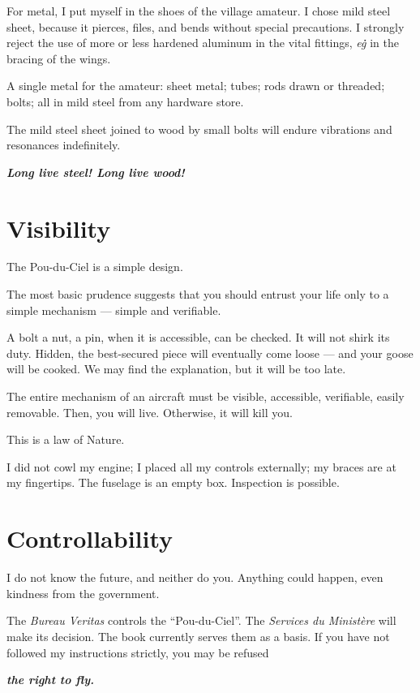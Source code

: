 \documentclass{book}
\begin{document}
For metal, I put myself in the shoes of the village amateur. I chose
mild steel sheet, because it pierces, files, and bends without special
precautions. I strongly reject the use of more or less hardened
aluminum in the vital fittings, \textit{e\.g\.} in the bracing of the
wings.

A single metal for the amateur: sheet metal; tubes; rods drawn or
threaded; bolts; all in mild steel from any hardware store.

The mild steel sheet joined to wood by small bolts will endure
vibrations and resonances indefinitely.

\textbf{\emph{Long live steel! Long live wood!}}

\section{Visibility}

The Pou-du-Ciel is a simple design.

The most basic prudence suggests that you should entrust your life
only to a simple mechanism --- simple and verifiable.

A bolt a nut, a pin, when it is accessible, can be checked. It will
not shirk its duty. Hidden, the best-secured piece will eventually
come loose --- and your goose will be cooked.  We may find the
explanation, but it will be too late.

The entire mechanism of an aircraft must be visible, accessible,
verifiable, easily removable. Then, you will live. Otherwise, it will
kill you.

This is a law of Nature.

I did not cowl my engine; I placed all my controls externally; my
braces are at my fingertips. The fuselage is an empty box. Inspection
is possible.

\section{Controllability}

I do not know the future, and neither do you. Anything could happen,
even kindness from the government.

The \textit{Bureau Veritas} controls the ``Pou-du-Ciel''. The
\textit{Services du Ministère} will make its decision. The book
currently serves them as a basis. If you have not followed my
instructions strictly, you may be refused

\begin{center}
  \textbf{ \large \emph{the right to fly.}}
\end{center}
\end{document}
